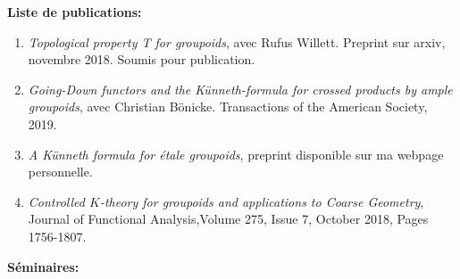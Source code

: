 \documentclass[a4paper,11pt]{article}
\newcommand\espace{\vrule height 20pt width 0pt}
\begin{document}
\textbf{Liste de publications:} 
\begin{enumerate}
\item \textit{Topological property T for groupoids}, avec Rufus Willett. Preprint sur arxiv, novembre 2018. Soumis pour publication.
\item \textit{Going-Down functors and the Künneth-formula for crossed products by ample groupoids}, avec Christian Bönicke. Transactions of the American Society, 2019.
\item \textit{A K\"{u}nneth formula for \'etale groupoids}, preprint disponible sur ma webpage personnelle.
\item \textit{Controlled $K$-theory for groupoids and applications to Coarse Geometry}, Journal of Functional Analysis,Volume 275, Issue 7, October 2018, Pages 1756-1807. 
\end{enumerate}

\espace

\textbf{S\'eminaires:}
\end{document}
